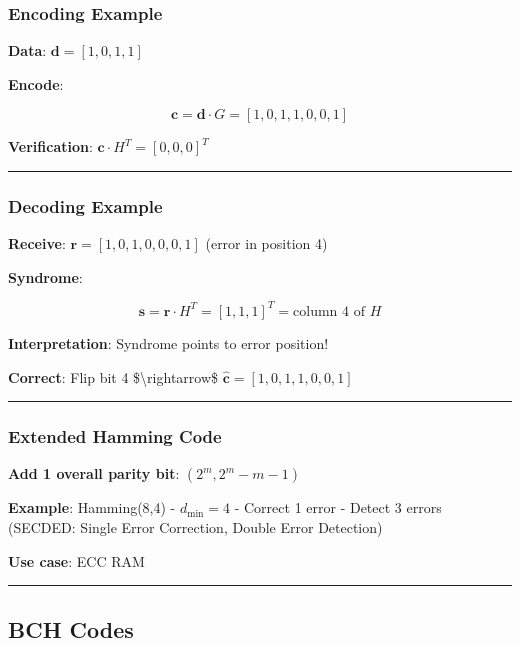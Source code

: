 \subsubsection{Encoding Example}\label{encoding-example}

\textbf{Data}: \(\mathbf{d} = [1, 0, 1, 1]\)

\textbf{Encode}:

\[
\mathbf{c} = \mathbf{d} \cdot G = [1, 0, 1, 1, 0, 0, 1]
\]

\textbf{Verification}: \(\mathbf{c} \cdot H^T = [0, 0, 0]^T\)

\begin{center}\rule{0.5\linewidth}{0.5pt}\end{center}

\subsubsection{Decoding Example}\label{decoding-example}

\textbf{Receive}: \(\mathbf{r} = [1, 0, 1, 0, 0, 0, 1]\) (error in
position 4)

\textbf{Syndrome}:

\[
\mathbf{s} = \mathbf{r} \cdot H^T = [1, 1, 1]^T = \text{column 4 of } H
\]

\textbf{Interpretation}: Syndrome points to error position!

\textbf{Correct}: Flip bit 4 \$\textbackslash rightarrow\$
\(\hat{\mathbf{c}} = [1, 0, 1, 1, 0, 0, 1]\)

\begin{center}\rule{0.5\linewidth}{0.5pt}\end{center}

\subsubsection{Extended Hamming Code}\label{extended-hamming-code}

\textbf{Add 1 overall parity bit}: \((2^m, 2^m - m - 1)\)

\textbf{Example}: Hamming(8,4) - \(d_{\min} = 4\) - Correct 1 error -
Detect 3 errors (SECDED: Single Error Correction, Double Error
Detection)

\textbf{Use case}: ECC RAM

\begin{center}\rule{0.5\linewidth}{0.5pt}\end{center}

\subsection{BCH Codes}\label{bch-codes}

